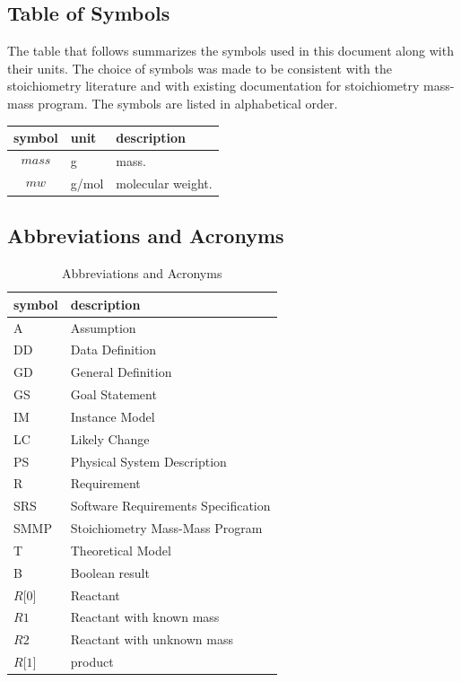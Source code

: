 \documentclass[12pt]{article}
\begin{document}
\subsection{Table of Symbols}

The table that follows summarizes the symbols used in this document along with
their units. The choice of symbols was made to be consistent with the stoichiometry 
literature and with existing documentation for stoichiometry mass-mass program. The symbols are listed in alphabetical order.

\renewcommand{\arraystretch}{1.2}
\noindent \begin{longtable*}{l l p{12cm}} \toprule
\endlastfoot
\textbf{symbol} & \textbf{unit} & \textbf{description}\\
\midrule 
$$\textit{mass}$$ & \si[per-mode=symbol] {\gram} & mass.\\
$$\textit{mw}$$ & \si[per-mode=symbol] {\gram/\mol} & molecular weight.\\ 
\bottomrule
\end{longtable*}

\subsection{Abbreviations and Acronyms}

\renewcommand{\arraystretch}{1.2}
\begin{table}[ht]
\begin{tabular}{l l} 
  \toprule		
  \textbf{symbol} & \textbf{description}\\
  \midrule 
  A & Assumption\\
  DD & Data Definition\\
  GD & General Definition\\
  GS & Goal Statement\\
  IM & Instance Model\\
  LC & Likely Change\\
  PS & Physical System Description\\
  R & Requirement\\
  SRS & Software Requirements Specification\\
 SMMP & Stoichiometry Mass-Mass Program\\
  T & Theoretical Model\\
  B & Boolean result\\
  $\textit{R[0]}$ & Reactant \\
  $\textit{R1}$ & Reactant with known mass\\
  $\textit{R2}$ & Reactant with unknown mass\\
  $\textit{R[1]}$ & product \\
  \bottomrule
  \end{tabular}
  \caption{ Abbreviations and Acronyms}
 \end{table}
\end{document}
